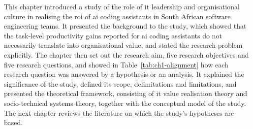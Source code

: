This chapter introduced a study of the role of \gls{it} leadership and organisational culture in realising the \gls{roi} of \gls{ai} coding assistants in South African software engineering teams. It presented the background to the study, which showed that the task-level productivity gains reported for \gls{ai} coding assistants do not necessarily translate into organisational value, and stated the research problem explicitly. The chapter then set out the research aim, five research objectives and five research questions, and showed in Table~\ref{tab:ch1-alignment} how each research question was answered by a hypothesis or an analysis. It explained the significance of the study, defined its scope, delimitations and limitations, and presented the theoretical framework, consisting of \gls{it} value realisation theory and socio-technical systems theory, together with the conceptual model of the study. The next chapter reviews the literature on which the study's hypotheses are based.

